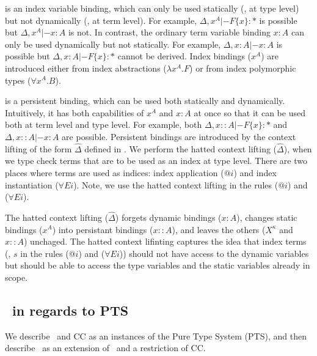  is an index variable binding, which can only be used statically
(\ie, at type level) but not dynamically (\ie, at term level). For example,
$\Delta,x^A |- F \{x\} :*$ is possible but $\Delta,x^A |- x:A$ is not.
In contrast, the ordinary term variable binding $x:A$ can only be used
dynamically but not statically. For example, $\Delta,x:A |- x:A$ is possible
but $\Delta,x:A |- F \{x\}:*$ cannot be derived. Index bindings ($x^A$) are
introduced either from index abstractions ($\lambda x^A.F$)
or from index polymorphic types ($\forall x^A.B$).

 is a persistent binding, which can be used both statically and
dynamically. Intuitively, it has both capabilities of $x^A$ and $x:A$ at once
so that it can be used both at term level and type level. For example,
both $\Delta,x::A |- F \{x\} :*$ and $\Delta,x::A |- x:A$ are possible.
Persistent bindings are introduced by the context lifting of the form
$\hat\Delta$ defined in . We perform the hatted context lifting
($\hat\Delta$), when we type check terms that are to be used as an index
at type level. There are two places where terms are used as indices:
index application ($@i$) and index instantiation ($\forall E i$).
Note, we use the hatted context lifting in the rules ($@i$) and ($\forall E i$).

The hatted context lifting ($\hat\Delta$) forgets dynamic bindings ($x:A$),
changes static bindings ($x^A$) into persistant bindings ($x::A$), and leaves
the others ($X^\kappa$ and $x::A$) unchaged. The hatted context lifinting
captures the idea that index terms (\eg, $s$ in the rules ($@i$)
and ($\forall E i$)) should not have access to the dynamic variables but should
be able to access the type variables and the static variables already in scope.



\subsection{\Fi\ in regards to PTS}
We describe \Fw\ and CC as an instances of the Pure Type System (PTS),
and then describe \Fi\ as an extension of \Fw\ and a restriction of CC.

